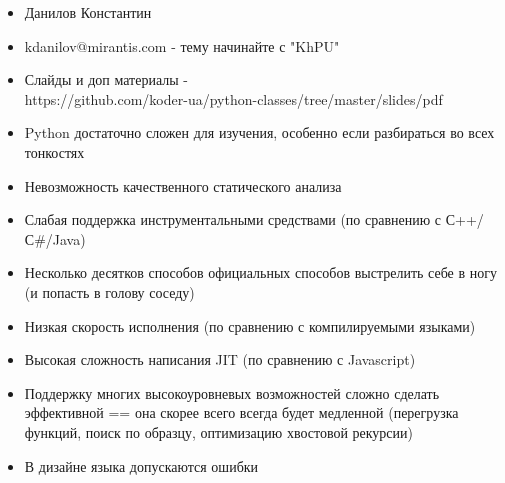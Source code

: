 \documentclass{article}
\begin{document}
\LARGE

\begin{itemize}
    \item Данилов Константин
    \item kdanilov@mirantis.com - тему начинайте с "KhPU"
    \item Слайды и доп материалы - \\
            https://github.com/koder-ua/python-classes/tree/master/slides/pdf
\end{itemize}
\newpage
\begin{itemize}
    \item Python достаточно сложен для изучения, особенно если разбираться во всех тонкостях
    \item Невозможность качественного статического анализа
    \item Слабая поддержка инструментальными средствами (по сравнению с С++/С\#/Java)
    \item Несколько десятков способов официальных способов выстрелить себе в ногу (и попасть в голову соседу)
    \item Низкая скорость исполнения (по сравнению с компилируемыми языками)
    \item Высокая сложность написания JIT (по сравнению с Javascript)
    \item Поддержку многих высокоуровневых возможностей сложно сделать эффективной 
          == она скорее всего всегда будет медленной
            (перегрузка функций, поиск по образцу, оптимизацию хвостовой рекурсии)
    \item В дизайне языка допускаются ошибки
\end{itemize}
\newpage
\end{document}
